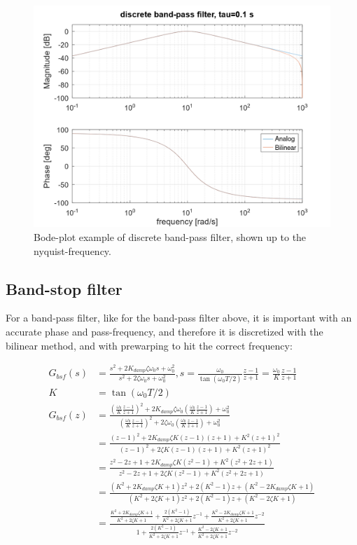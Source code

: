 \documentclass[]{book}
\begin{document}
\begin{figure}
\includegraphics[width=1\linewidth]{images/filters/bpf_disc} \caption{Bode-plot example of discrete band-pass filter, shown up to the nyquist-frequency.}\label{fig:unnamed-chunk-10}
\end{figure}

\hypertarget{band-stop-filter-1}{%
\subsection{Band-stop filter}\label{band-stop-filter-1}}

For a band-pass filter, like for the band-pass filter above, it is important with an accurate phase and pass-frequency, and therefore it is discretized with the bilinear method, and with prewarping to hit the correct frequency:

\[
\begin{aligned}
G_{bsf}(s) &=  \frac{s^2 + 2K_ {damp}\zeta \omega_0 s + \omega_0^2}{s^2 + 2\zeta \omega_0 s + \omega_0^2}
, s=\frac{\omega_0}{\tan(\omega_0 T/2)} \frac{z-1}{z+1} =\frac{\omega_0}{K} \frac{z-1}{z+1} \\
K &= \tan(\omega_0 T/2) \\
G_{bsf}(z) &=  \frac{(\frac{\omega_0}{K} \frac{z-1}{z+1})^2 + 2K_ {damp}\zeta \omega_0 (\frac{\omega_0}{K} \frac{z-1}{z+1}) + \omega_0^2}{(\frac{\omega_0}{K} \frac{z-1}{z+1})^2 + 2\zeta \omega_0 (\frac{\omega_0}{K} \frac{z-1}{z+1}) + \omega_0^2} \\
&=  \frac{ (z-1)^2 + 2K_ {damp}\zeta K (z-1)(z+1) + K^2(z+1)^2}{ (z-1)^2 + 2\zeta K (z-1)(z+1) + K^2(z+1)^2} \\
&=  \frac{z^2-2z+1 + 2K_ {damp}\zeta K (z^2-1) + K^2(z^2+2z+1)}{ z^2-2z+1 + 2\zeta K (z^2-1) + K^2(z^2+2z+1)} \\
&=  \frac{ (K^2+2K_ {damp}\zeta K+1)z^2 +  2(K^2-1)z + (K^2-2K_ {damp}\zeta K+1)}{ (K^2+2\zeta K+1)z^2 +  2(K^2-1)z + (K^2-2\zeta K+1)  } \\
&=  \frac{  \frac{K^2+2K_ {damp}\zeta K+1}{K^2+2\zeta K+1} +  \frac{2(K^2-1)}{K^2+2\zeta K+1}z^{-1} + \frac{K^2-2K_ {damp}\zeta K+1}{K^2+2\zeta K+1}z^{-2} }{ 1 +  \frac{2(K^2-1)}{K^2+2\zeta K+1}z^{-1} + \frac{K^2-2\zeta K+1}{K^2+2\zeta K+1}z^{-2}  } \\
\end{aligned}
\label{eq:dbsf1}
\]
\end{document}
